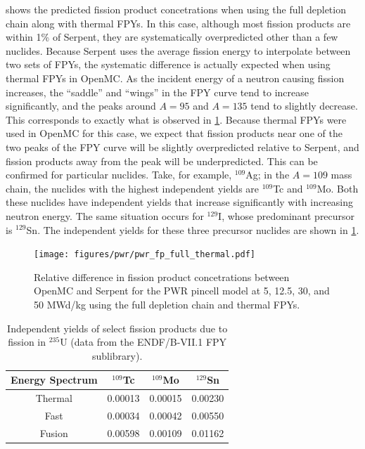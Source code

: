 \documentclass[3p,authoryear]{elsarticle}
\begin{document}
 shows the predicted fission product concetrations
when using the full depletion chain along with thermal FPYs. In this case,
although most fission products are within 1\% of Serpent, they are
systematically overpredicted other than a few nuclides. Because Serpent uses the
average fission energy to interpolate between two sets of FPYs, the systematic
difference is actually expected when using thermal FPYs in OpenMC. As the
incident energy of a neutron causing fission increases, the ``saddle'' and
``wings'' in the FPY curve tend to increase significantly, and the peaks around
$A=95$ and $A=135$ tend to slightly decrease. This corresponds to exactly what
is observed in \cref{fig:pwr-fp-full-thermal}. Because thermal FPYs were used in
OpenMC for this case, we expect that fission products near one of the two peaks
of the FPY curve will be slightly overpredicted relative to Serpent, and fission
products away from the peak will be underpredicted. This can be confirmed for
particular nuclides. Take, for example, $^{109}$Ag; in the $A=109$ mass chain,
the nuclides with the highest independent yields are $^{109}$Tc and $^{109}$Mo.
Both these nuclides have independent yields that increase significantly with
increasing neutron energy. The same situation occurs for $^{129}$I, whose
predominant precursor is $^{129}$Sn. The independent yields for these three
precursor nuclides are shown in \cref{tab:fp-yields}.
\begin{figure}[H]
  \centering
  \texttt{[image: figures/pwr/pwr\_fp\_full\_thermal.pdf]}
  \caption{Relative difference in fission product concetrations between OpenMC
  and Serpent for the PWR pincell model at 5, 12.5, 30, and 50 MWd/kg using the
  full depletion chain and thermal FPYs.}
  \label{fig:pwr-fp-full-thermal}
\end{figure}
\begin{table}[htbp]
  \centering
  \caption{Independent yields of select fission products due to fission in
  $^{235}$U (data from the ENDF/B-VII.1 FPY sublibrary).}
  \label{tab:fp-yields}
  \begin{tabular}{cccc}
    \toprule
    \textbf{Energy Spectrum} & \textbf{$^{109}$Tc} & \textbf{$^{109}$Mo} & \textbf{$^{129}$Sn} \\
    \midrule
    Thermal & 0.00013 & 0.00015 & 0.00230 \\
    Fast & 0.00034 & 0.00042 & 0.00550 \\
    Fusion & 0.00598 & 0.00109 & 0.01162 \\
    \bottomrule
  \end{tabular}
\end{table}
\end{document}
